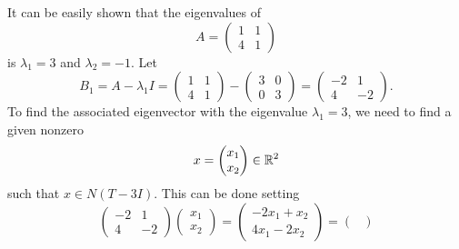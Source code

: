 \begin{eg}
    It can be easily shown that the eigenvalues of 
   \[  A = \begin{pmatrix} 
       1 & 1 \\
       4 & 1
             \end{pmatrix}  \] 
             is \( {\lambda}_{1} = 3  \) and \( {\lambda}_{2} = - 1 \). Let 
             \[  {B}_{1} = A - {\lambda}_{1} I = \begin{pmatrix} 
                 1 & 1 \\
                 4 & 1 
                       \end{pmatrix}  - \begin{pmatrix} 
                 3 & 0 \\
                 0 & 3 
                                 \end{pmatrix} = \begin{pmatrix} 
                 -2 & 1 \\
                 4 & -2 
                                           \end{pmatrix}. \]
                To find the associated eigenvector with the eigenvalue \( {\lambda}_{1} = 3  \), we need to find a given nonzero 
                \[  x = \begin{pmatrix} 
                           {x}_{1} \\
                           {x}_{2}
                          \end{pmatrix}  \in \mathbb{R}^{2} \]
                          such that \( x \in N(T- 3I) \). This can be done setting
                          \[  \begin{pmatrix} 
                              -2 & 1 \\
                              4 & -2 
                                    \end{pmatrix} \begin{pmatrix} 
                                               {x}_{1} \\
                                               {x}_{2}
                                              \end{pmatrix} = \begin{pmatrix} 
                              {-2x}_{1}+ {x}_{2} \\
                              {4x}_{1}- {2x}_{2}
                                                        \end{pmatrix} = \begin{pmatrix} 

\end{pmatrix}\]
\end{eg}

